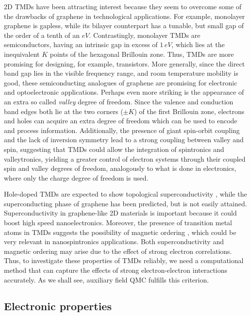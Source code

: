 \acl{2D} \acp{TMD} have been attracting interest because they seem to overcome some of the drawbacks of graphene in technological applications.
For example, monolayer graphene is gapless, while its bilayer counterpart has a tunable, but small gap of the order of a tenth of an $eV$.
Contrastingly, monolayer \acp{TMD} are semiconductors, having an intrinsic gap in excess of $1 \, eV$, which lies at the inequivalent $K$ points of the hexagonal Brillouin zone.
Thus, \acp{TMD} are more promising for designing, for example, transistors.
More generally, since the direct band gap lies in the visible frequency range, and room temperature mobility is good, these semiconducting analogues of graphene are promising for electronic and optoelectronic applications.
Perhaps even more striking is the appearance of an extra so called \emph{valley} degree of freedom.
Since the valence and conduction band edges both lie at the two corners ($\pm K$) of the first Brillouin zone, electrons and holes can acquire an extra degree of freedom which can be used to encode and process information.
Additionally, the presence of giant spin-orbit coupling and the lack of inversion symmetry lead to a strong coupling between valley and spin, suggesting that \acp{TMD} could allow the integration of spintronics and valleytronics, yielding a greater control of electron systems through their coupled spin and valley degrees of freedom, analogously to what is done in electronics, where only the charge degree of freedom is used.
 
Hole-doped \acp{TMD} are expected to show topological superconductivity \cite{hsu_topological_2017}, while the superconducting phase of graphene has been predicted, but is not easily attained.
Superconductivity in graphene-like \ac{2D} materials is important because it could boost high speed nanoelectronics.
Moreover, the presence of transition metal atoms in \acp{TMD} suggests the possibility of magnetic ordering \cite{braz_valley_2017}, which could be very relevant in nanospintronics applications.
Both superconductivity and magnetic ordering may arise due to the effect of strong electron correlations.
Thus, to investigate these properties of \acp{TMD} reliably, we need a computational method that can  capture the effects of strong electron-electron interactions accurately.
As we shall see, auxiliary field \ac{QMC}  fulfills this criterion.

\subsection{Electronic properties}\label{subsec:electronic}

